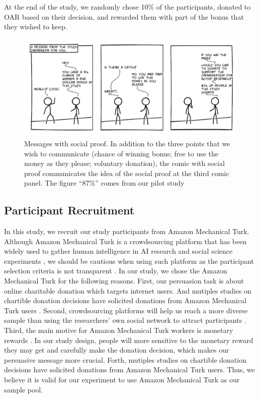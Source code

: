 At the end of the study, we randomly chose 10\% of the participants, donated to OAR based on their decision, and rewarded them with part of the bonus that they wished to keep.




\begin{figure}[bt]
    \centering
    \includegraphics[width=\columnwidth]{./figures/social_proof.png}
    \caption{Messages with social proof. In addition to the three points that we wish to communicate (chance of winning bonus; free to use the money as they please; voluntary donation), the comic with social proof communicates the idea of the social proof at the third comic panel. The figure ``87\%'' comes from our pilot study}
    \label{fig:basic three comic social proof}
\end{figure}



\subsection{Participant Recruitment}
\label{sub:Participant Recruitment}
In this study, we recruit our study participants from Amazon Mechanical Turk. Although Amazon Mechanical Turk is a crowdsourcing platform that has been widely used to gather human intelligence in AI research and social science experiments \cite{ paolacci2014inside,berinsky2012evaluating,buhrmester2011amazon}, we should be cautious when using such platform as the participant selection criteria is not transparent \cite{landers2015inconvenient,paolacci2010running}. In our study, we chose the Amazon Mechanical Turk for the following reasons. First, our persuasion task is about online charitable donation which targets internet users. And mutiples studies on chartible donation decisions have solicited donations from Amazon Mechanical Turk users \cite{branas2018gender,lee2013does,saunders2016no,arechar2017turking,sussman2015framing}. Second, crowdsourcing platforms will help us reach a more diverse sample than using the researchers' own social network to attract participants \cite{buhrmester2011amazon}. Third, the main motive for Amazon Mechanical Turk workers is monetary rewards \cite{berinsky2012evaluating}. In our study design, people will more sensitive to the monetary reward they may get and carefully make the donation decision, which makes our persuasive message more crucial. Forth, mutiples studies on chartible donation decisions have solicited donations from Amazon Mechanical Turk users. Thus, we believe it is valid for our experiment to use Amazon Mechanical Turk as our sample pool. 

